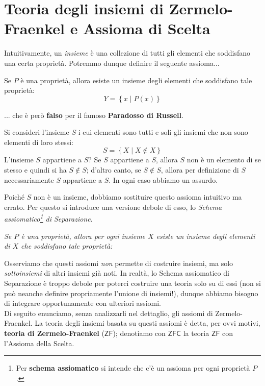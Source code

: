 \section{Teoria degli insiemi di Zermelo-Fraenkel e Assioma di Scelta}
Intuitivamente, un \textit{insieme} è una collezione di tutti gli elementi che soddisfano una certa proprietà. Potremmo dunque definire il seguente assioma...
\begin{falseaxiom}
	Se $P$ è una proprietà, allora esiste un insieme degli elementi che soddisfano tale proprietà:
	\begin{equation*}
		Y=\left\{x\middle|P\left(x\right)\right\}
	\end{equation*}
\end{falseaxiom}
... che è però \textbf{falso} per il famoso \textbf{Paradosso di Russell}.
\begin{examplewt}
	Si consideri l'insieme $S$ i cui elementi sono tutti e soli gli insiemi che non sono elementi di loro stessi:
	\begin{equation*}
		S=\left\{X\middle|X\notin X\right\}
	\end{equation*}
L'insieme $S$ appartiene a $S$? Se $S$ appartiene a $S$, allora $S$ non è un elemento di se stesso e quindi si ha $S\notin S$; d'altro canto, se $S\notin S$, allora per definizione di $S$ necessariamente $S$ appartiene a $S$. In ogni caso abbiamo un assurdo.
\end{examplewt}
Poiché $S$ non è un insieme, dobbiamo sostituire questo assioma intuitivo ma errato. Per questo si introduce una versione debole di esso, lo \textit{Schema assiomatico\footnote{Per \textbf{schema assiomatico} si intende che c'è un assioma per ogni proprietà $P$.} di Separazione}.
\begin{center}
	\emph{Se $P$ è una proprietà, allora per ogni insieme $X$ esiste un insieme degli elementi di $X$ che soddisfano tale proprietà:}
\end{center}
Osserviamo che questi assiomi \textit{non} permette di costruire insiemi, ma solo \textit{sottoinsiemi} di altri insiemi già noti. In realtà, lo Schema assiomatico di Separazione è troppo debole per poterci costruire una teoria solo su di essi (non si può neanche definire propriamente l'unione di insiemi!), dunque abbiamo bisogno di integrare opportunamente con ulteriori assiomi.\\
Di seguito enunciamo, senza analizzarli nel dettaglio, gli assiomi di Zermelo-Fraenkel. La teoria degli insiemi basata su questi assiomi è detta, per ovvi motivi, \textbf{teoria di Zermelo-Fraenkel} ($\mathsf{ZF}$); denotiamo con $\mathsf{ZFC}$ la teoria $\mathsf{ZF}$ con l'Assioma della Scelta.

